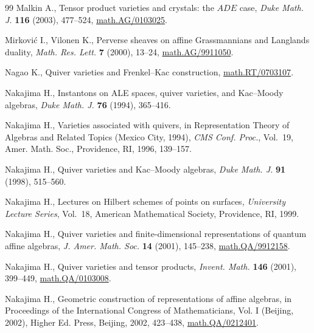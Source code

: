 \begin{thebibliography}{99}
Malkin A.,  Tensor product varieties and crystals: the {$ADE$} case, {\it Duke
  Math. J.} \textbf{116} (2003),  477--524, \href{http://arxiv.org/abs/math.AG/0103025}{math.AG/0103025}. %

Mirkovi{\'c} I., Vilonen K.,  Perverse sheaves on af\/f\/ine
  {G}rassmannians and {L}anglands duality, {\it Math. Res. Lett.} \textbf{7} (2000),
 13--24, \href{http://arxiv.org/abs/math.AG/9911050}{math.AG/9911050}. %

Nagao K.,  Quiver varieties and Frenkel--Kac construction,   \href{http://arxiv.org/abs/math.RT/0703107}{math.RT/0703107}.

Nakajima H., Instantons on {ALE} spaces, quiver varieties, and
  Kac--Moody algebras, {\it Duke Math. J.} \textbf{76} (1994), 365--416.

Nakajima H., Varieties associated with quivers, in Representation Theory of
  Algebras and Related Topics (Mexico City, 1994), {\it CMS Conf. Proc.}, Vol.~19,
  Amer. Math. Soc., Providence, RI, 1996, 139--157.

Nakajima H., Quiver varieties and Kac--Moody algebras, {\it Duke Math. J.}
  \textbf{91} (1998), 515--560. %

Nakajima H., Lectures on Hilbert schemes of points on surfaces, {\it University
  Lecture Series}, Vol.~18, American Mathematical Society, Providence, RI, 1999.

Nakajima H., Quiver varieties and f\/inite-dimensional representations of
  quantum af\/f\/ine algebras, {\it J. Amer. Math. Soc.} \textbf{14} (2001),
  145--238, \href{http://arxiv.org/abs/math.QA/9912158}{math.QA/9912158}. %

Nakajima H., Quiver varieties and tensor products, {\it Invent. Math.}
  \textbf{146} (2001), 399--449, \href{http://arxiv.org/abs/math.QA/0103008}{math.QA/0103008}. %

Nakajima H., Geometric construction of representations of af\/f\/ine algebras,
  in Proceedings of the International Congress of Mathematicians, Vol. I (Beijing,
  2002), Higher Ed. Press, Beijing, 2002, 423--438, \href{http://arxiv.org/abs/math.QA/0212401}{math.QA/0212401}. %


\end{thebibliography}
